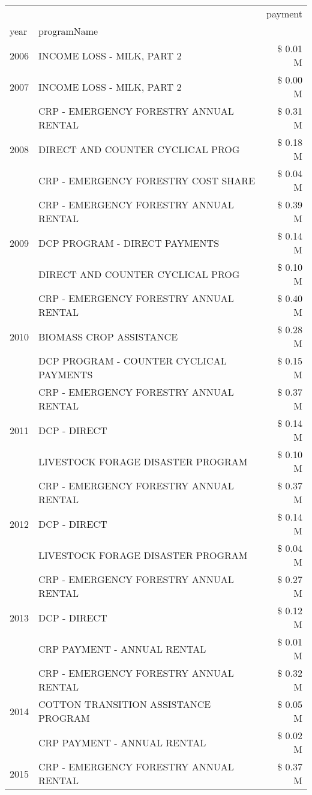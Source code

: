 \begin{tabular}{llr}
\toprule
 &  & payment \\
year & programName &  \\
\midrule
2006 & INCOME LOSS - MILK, PART 2 & \$ 0.01 M \\
\cline{1-3}
2007 & INCOME LOSS - MILK, PART 2 & \$ 0.00 M \\
\cline{1-3}
\multirow[t]{3}{*}{2008} & CRP - EMERGENCY FORESTRY ANNUAL RENTAL & \$ 0.31 M \\
 & DIRECT AND COUNTER CYCLICAL PROG & \$ 0.18 M \\
 & CRP - EMERGENCY FORESTRY COST SHARE & \$ 0.04 M \\
\cline{1-3}
\multirow[t]{3}{*}{2009} & CRP - EMERGENCY FORESTRY ANNUAL RENTAL & \$ 0.39 M \\
 & DCP PROGRAM - DIRECT PAYMENTS & \$ 0.14 M \\
 & DIRECT AND COUNTER CYCLICAL PROG & \$ 0.10 M \\
\cline{1-3}
\multirow[t]{3}{*}{2010} & CRP - EMERGENCY FORESTRY ANNUAL RENTAL & \$ 0.40 M \\
 & BIOMASS CROP ASSISTANCE & \$ 0.28 M \\
 & DCP PROGRAM - COUNTER CYCLICAL PAYMENTS & \$ 0.15 M \\
\cline{1-3}
\multirow[t]{3}{*}{2011} & CRP - EMERGENCY FORESTRY ANNUAL RENTAL & \$ 0.37 M \\
 & DCP - DIRECT & \$ 0.14 M \\
 & LIVESTOCK FORAGE DISASTER PROGRAM & \$ 0.10 M \\
\cline{1-3}
\multirow[t]{3}{*}{2012} & CRP - EMERGENCY FORESTRY ANNUAL RENTAL & \$ 0.37 M \\
 & DCP - DIRECT & \$ 0.14 M \\
 & LIVESTOCK FORAGE DISASTER PROGRAM & \$ 0.04 M \\
\cline{1-3}
\multirow[t]{3}{*}{2013} & CRP - EMERGENCY FORESTRY ANNUAL RENTAL & \$ 0.27 M \\
 & DCP - DIRECT & \$ 0.12 M \\
 & CRP PAYMENT - ANNUAL RENTAL & \$ 0.01 M \\
\cline{1-3}
\multirow[t]{3}{*}{2014} & CRP - EMERGENCY FORESTRY ANNUAL RENTAL & \$ 0.32 M \\
 & COTTON TRANSITION ASSISTANCE PROGRAM & \$ 0.05 M \\
 & CRP PAYMENT - ANNUAL RENTAL & \$ 0.02 M \\
\cline{1-3}
\multirow[t]{3}{*}{2015} & CRP - EMERGENCY FORESTRY ANNUAL RENTAL & \$ 0.37 M \\

\end{tabular}
